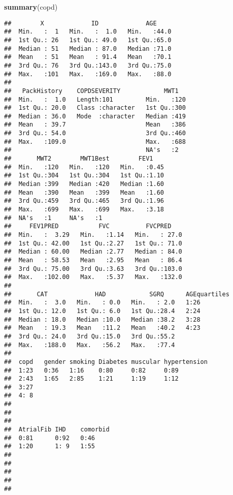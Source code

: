 \documentclass[
]{article}
\newenvironment{Shaded}{\begin{snugshade}}{\end{snugshade}}
\newcommand{\FunctionTok}[1]{\textcolor[rgb]{0.13,0.29,0.53}{\textbf{#1}}}
\newcommand{\NormalTok}[1]{#1}
\begin{document}
\begin{Shaded}
\begin{Highlighting}[]
\FunctionTok{summary}\NormalTok{(copd)}
\end{Highlighting}
\end{Shaded}

\begin{verbatim}
##        X             ID             AGE      
##  Min.   :  1   Min.   :  1.0   Min.   :44.0  
##  1st Qu.: 26   1st Qu.: 49.0   1st Qu.:65.0  
##  Median : 51   Median : 87.0   Median :71.0  
##  Mean   : 51   Mean   : 91.4   Mean   :70.1  
##  3rd Qu.: 76   3rd Qu.:143.0   3rd Qu.:75.0  
##  Max.   :101   Max.   :169.0   Max.   :88.0  
##                                              
##   PackHistory    COPDSEVERITY            MWT1    
##  Min.   :  1.0   Length:101         Min.   :120  
##  1st Qu.: 20.0   Class :character   1st Qu.:300  
##  Median : 36.0   Mode  :character   Median :419  
##  Mean   : 39.7                      Mean   :386  
##  3rd Qu.: 54.0                      3rd Qu.:460  
##  Max.   :109.0                      Max.   :688  
##                                     NA's   :2    
##       MWT2        MWT1Best        FEV1     
##  Min.   :120   Min.   :120   Min.   :0.45  
##  1st Qu.:304   1st Qu.:304   1st Qu.:1.10  
##  Median :399   Median :420   Median :1.60  
##  Mean   :390   Mean   :399   Mean   :1.60  
##  3rd Qu.:459   3rd Qu.:465   3rd Qu.:1.96  
##  Max.   :699   Max.   :699   Max.   :3.18  
##  NA's   :1     NA's   :1                   
##     FEV1PRED           FVC          FVCPRED     
##  Min.   :  3.29   Min.   :1.14   Min.   : 27.0  
##  1st Qu.: 42.00   1st Qu.:2.27   1st Qu.: 71.0  
##  Median : 60.00   Median :2.77   Median : 84.0  
##  Mean   : 58.53   Mean   :2.95   Mean   : 86.4  
##  3rd Qu.: 75.00   3rd Qu.:3.63   3rd Qu.:103.0  
##  Max.   :102.00   Max.   :5.37   Max.   :132.0  
##                                                 
##       CAT             HAD            SGRQ      AGEquartiles
##  Min.   :  3.0   Min.   : 0.0   Min.   : 2.0   1:26        
##  1st Qu.: 12.0   1st Qu.: 6.0   1st Qu.:28.4   2:24        
##  Median : 18.0   Median :10.0   Median :38.2   3:28        
##  Mean   : 19.3   Mean   :11.2   Mean   :40.2   4:23        
##  3rd Qu.: 24.0   3rd Qu.:15.0   3rd Qu.:55.2               
##  Max.   :188.0   Max.   :56.2   Max.   :77.4               
##                                                            
##  copd   gender smoking Diabetes muscular hypertension
##  1:23   0:36   1:16    0:80     0:82     0:89        
##  2:43   1:65   2:85    1:21     1:19     1:12        
##  3:27                                                
##  4: 8                                                
##                                                      
##                                                      
##                                                      
##  AtrialFib IHD    comorbid
##  0:81      0:92   0:46    
##  1:20      1: 9   1:55    
##                           
##                           
##                           
##                           
## 
\end{verbatim}
\end{document}
